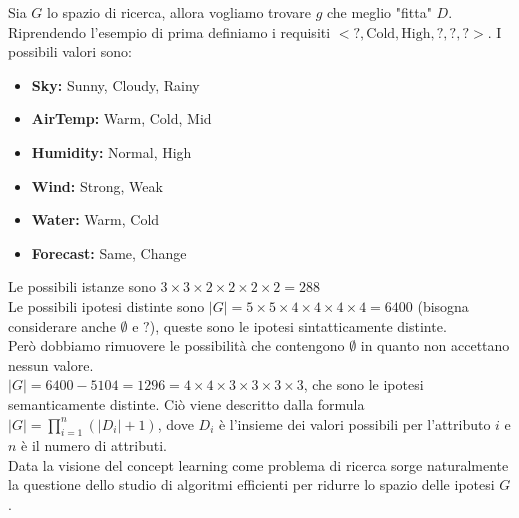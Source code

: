 Sia $G$ lo spazio di ricerca, allora vogliamo trovare $g$ che meglio "fitta" $D$. Riprendendo l'esempio di prima definiamo i requisiti $< ?, \text{Cold}, \text{High}, ?, ?, ? >$. I possibili valori sono:
\begin{itemize}
	\item \textbf{Sky:} Sunny, Cloudy, Rainy
	\item \textbf{AirTemp:} Warm, Cold, Mid
	\item \textbf{Humidity:} Normal, High
	\item \textbf{Wind:} Strong, Weak
	\item \textbf{Water:} Warm, Cold
	\item \textbf{Forecast:} Same, Change
\end{itemize}
Le possibili istanze sono $3 \times 3 \times 2 \times 2 \times 2 \times 2 = 288$\\
Le possibili ipotesi distinte sono $|G| = 5\times 5\times 4\times 4\times 4\times 4=6400$ (bisogna considerare anche $\emptyset$ e $?$), queste sono le ipotesi sintatticamente distinte.\\
Però dobbiamo rimuovere le possibilità che contengono $\emptyset$ in quanto non accettano nessun valore.\\
$|G|=6400 - 5104 = 1296 = 4 \times 4 \times 3 \times 3 \times 3 \times 3$, che sono le ipotesi semanticamente distinte.
Ciò viene descritto dalla formula $|G| = \prod_{i=1}^{n} (|D_i| + 1)$, dove $D_i$ è l'insieme dei valori possibili per l'attributo $i$ e $n$ è il numero di attributi.
\\
Data la visione del concept learning come problema di ricerca sorge naturalmente la questione dello studio di algoritmi efficienti per ridurre lo spazio delle ipotesi $G$.
